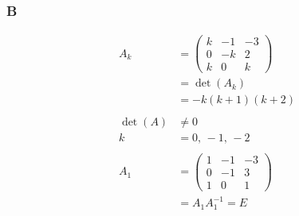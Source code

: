\documentclass{article}
\begin{document}
\subsubsection*{B}
\begin{align*}
    A_k &= \left(\begin{matrix}
        k & -1 & -3\\
        0 & -k & 2\\
        k & 0 & k
    \end{matrix}\right)\\
    &= \det (A_k)\\
    &= -k(k+1)(k+2)\\\\
    \det(A) &\neq 0\\
    k &= 0,\, -1,\, -2\\\\
    A_1 &= \left(\begin{matrix}
        1&-1&-3\\0&-1&3\\1&0&1
    \end{matrix}\right)\\
    &= A_1 A_1^{-1} = E\\
\end{align*}
\end{document}
